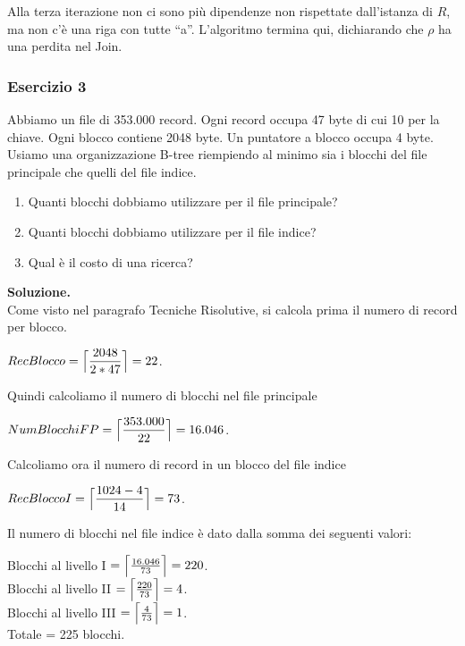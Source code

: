 Alla terza iterazione non ci sono più dipendenze non rispettate dall'istanza di $R$, ma non c'è una riga con tutte ``a''.
L'algoritmo termina qui, dichiarando che $\rho$ ha una perdita nel Join.
\subsubsection{Esercizio 3}
Abbiamo un file di 353.000 record. Ogni record occupa 47 byte di cui 10 per la chiave. Ogni blocco contiene 2048 byte. 
Un puntatore a blocco occupa 4 byte. Usiamo una organizzazione B-tree riempiendo al minimo sia i blocchi del file 
principale che quelli del file indice.

\begin{enumerate}
 \item Quanti blocchi dobbiamo utilizzare per il file principale? 
 \item Quanti blocchi dobbiamo utilizzare per il file indice?
 \item Qual è il costo di una ricerca?
\end{enumerate}

\noindent\textbf{\fontsize{14pt}{1em}Soluzione.}\\
Come visto nel paragrafo Tecniche Risolutive, si calcola prima il numero di record per blocco.
\begin{center}
 $RecBlocco = \Bigl\lceil \dfrac{2048}{2*47} \Bigr\rceil = 22$.\\
\end{center}
Quindi calcoliamo il numero di blocchi nel file principale
\begin{center}
 $NumBlocchiFP = \Bigl\lceil \dfrac{353.000}{22} \Bigr\rceil = 16.046$.\\
\end{center}
Calcoliamo ora il numero di record in un blocco del file indice
\begin{center}
 $RecBloccoI = \Bigl\lceil \dfrac{1024-4}{14} \Bigr\rceil = 73$.\\
\end{center}
Il numero di blocchi nel file indice è dato dalla somma dei seguenti valori:
\begin{center}
 Blocchi al livello I $= \Bigl\lceil \frac{16.046}{73} \Bigr\rceil = 220$.\\

 Blocchi al livello II $= \Bigl\lceil \frac{220}{73} \Bigr\rceil = 4$.\\

 Blocchi al livello III $= \Bigl\lceil \frac{4}{73} \Bigr\rceil = 1$.\\
 
 Totale = 225 blocchi.
\end{center}

